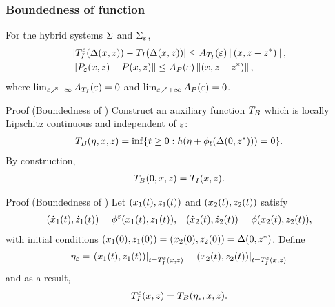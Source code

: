 \begin{frame}[t]
  \frametitle{Boundedness of \TtI{} function}
   {
    \begin{lemma}
      For the hybrid systems $\Sigma$ and $\Sigma_{\varepsilon}$,
      \begin{eqnarray}
        \nonumber
        &| T_{I}^{\varepsilon}(\Delta(x, z)) - T_{I}(\Delta(x, z)) | \leq A_{T_{I}}(\varepsilon) \left\|(x, z - z^{*})\right\|,\\
        &\| P_{\varepsilon}(x, z) - P(x, z) \| \leq A_{P}(\varepsilon) \left\|(x, z - z^{*})\right\|,
      \end{eqnarray}
      where $\lim_{\varepsilon \nearrow +\infty} A_{T_{I}}(\varepsilon) = 0$ and $\lim_{\varepsilon \nearrow +\infty}A_{P}(\varepsilon) = 0$.
    \end{lemma}
  }
   {
    \begin{block}{Proof (Boundedness of \TtI{})}
      Construct an auxiliary \tti{} function $T_{B}$ which is locally Lipschitz
      continuous and independent of $\varepsilon$:
      \begin{align*}
        T_{B}(\eta, x, z) = \inf\{t \geq 0 : h(\eta + \phi_{t}(\Delta(0, z^{*}))) = 0\}.
      \end{align*}
      By construction,
      \begin{align*}
        T_{B}(0, x, z) = T_{I}(x, z).
      \end{align*}
    \end{block}
    }

     {
      \begin{block}{Proof (Boundedness of \TtI{})}
        Let $(x_{1}(t), z_{1}(t))$ and $(x_{2}(t), z_{2}(t))$ satisfy\vspace{-.4em}
        \begin{align*}
          ({\dot {x}}_{1}(t), {\dot {z}}_{1}(t)) = \phi^{\varepsilon}(x_{1}(t), z_{1}(t)), && ({\dot {x}}_{2}(t), {\dot {z}}_{2}(t)) =
          \phi(x_{2}(t), z_{2}(t)),
        \end{align*}
        with initial conditions $(x_{1}(0), z_{1}(0)) = (x_{2}(0), z_{2}(0)) = \Delta(0,
        z^{*})$. Define
        \begin{align*}
          \eta_{\varepsilon} = \left.(x_{1}(t), z_{1}(t))\right|_{t = T_{I}^{\varepsilon}(x, z)} -
          \left.(x_{2}(t), z_{2}(t))\right|_{t = T_{I}^{\varepsilon}(x, z)}
        \end{align*}
        and as a result,\vspace{-.4em}
        \begin{align*}
          T_{I}^{\varepsilon}(x, z) = T_{B}(\eta_{\varepsilon}, x, z).
        \end{align*}

      \end{block}
    }
      

\end{frame}
